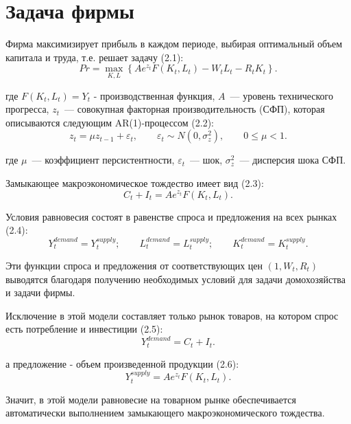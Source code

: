 \section{Задача фирмы}

Фирма максимизирует прибыль в каждом периоде, выбирая оптимальный объем капитала
и труда, т.е. решает задачу (2.1):
\begin{equation}
    Pr = \max_{K,L}
    \left\{
        A e^{z_t} F(K_t, L_t) - W_t L_t - R_t K_t
    \right\}.
\end{equation}

где $F(K_t, L_t) = Y_t$ - производственная функция,
$A$~--- уровень технического прогресса, $z_t$~--- совокупная факторная
производительность (СФП), которая описываются следующим AR(1)-процессом (2.2):
\begin{equation}
    z_t = \mu z_{t-1} + \varepsilon_t,
    \qquad
    \varepsilon_t \sim N(0, \sigma_z^2),
    \qquad
    0 \leq \mu < 1.
\end{equation}

где $\mu$~--- коэффициент персистентности,
$\varepsilon_t$~--- шок, $\sigma_z^2$~--- дисперсия шока СФП.


Замыкающее макроэкономическое тождество имеет вид (2.3):
\begin{equation}
    C_t + I_t = A e^{z_t} F(K_t, L_t).
\end{equation}

Условия равновесия состоят в равенстве спроса и предложения на всех рынках (2.4):
\begin{equation}
    Y_t^{demand} = Y_t^{supply};
    \qquad
    L_t^{demand} = L_t^{supply};
    \qquad
    K_t^{demand} = K_t^{supply}.
\end{equation}

Эти функции спроса и предложения от соответствующих цен $(1, W_t, R_t)$
выводятся благодаря получению необходимых условий для задачи домохозяйства
и задачи фирмы.

Исключение в этой модели составляет только рынок товаров, на котором спрос есть
потребление и инвестиции (2.5):
\begin{equation}
    Y_t^{demand} = C_t + I_t.
\end{equation}

а предложение - объем произведенной продукции (2.6):
\begin{equation}
    Y_t^{supply} = A e^{z_t} F(K_t,L_t).
\end{equation}

Значит, в этой модели равновесие на товарном рынке обеспечивается автоматически
выполнением замыкающего макроэкономического тождества.

